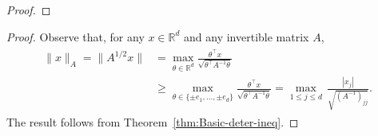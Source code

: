 \documentclass{article}
\begin{document}
\begin{appendices}
\begin{proof}
 
 
 
 
 
 
 
 
 
 
 
 
 
 
 
 
 
 
 
 
 
 
 
 
 
 
 
 \end{proof}
 
 \begin{proof}
 Observe that, for any $x\in\mathbb{R}^{d}$ and any invertible matrix $A$,
 \begin{align}\label{eq:Scaled-Euclidean-Maximum-Comparison}
 \begin{split}
 \|x\|_A = \|A^{1/2}x\| &= \max_{\theta\in\mathbb{R}^{d}}\frac{\theta^{\top}x}{\sqrt{\theta^{\top}A^{-1}\theta}}\\ &\geq \max_{\theta \in \{ \pm e_1,\ldots,\pm e_d \}} \frac{\theta^{\top}x}{\sqrt{\theta^{\top}A^{-1}\theta}} = \max_{1\le j\le d}\,\frac{|x_j|}{\sqrt{(A^{-1})_{jj}}}.
 \end{split}
 \end{align}
 The result follows from Theorem~\ref{thm:Basic-deter-ineq}.
 \end{proof}
 

\end{appendices}
\end{document}
